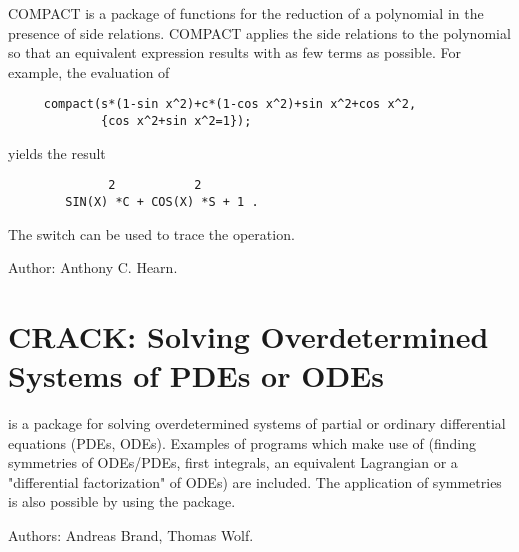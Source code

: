 COMPACT is a package of functions for the reduction of a polynomial in the
presence of side relations.  COMPACT applies the side relations to the
polynomial so that an equivalent expression results with as few terms as
possible.  For example, the evaluation of
\begin{verbatim}
     compact(s*(1-sin x^2)+c*(1-cos x^2)+sin x^2+cos x^2,
             {cos x^2+sin x^2=1});
\end{verbatim}
yields the result\pagebreak[1]
\begin{verbatim}
              2           2
        SIN(X) *C + COS(X) *S + 1 .
\end{verbatim}
The switch  can be used to trace the operation.

Author:  Anthony C. Hearn.
\fi

\section{CRACK: Solving Overdetermined Systems of PDEs or ODEs}

 is a package for solving overdetermined systems of partial or
ordinary differential equations (PDEs, ODEs).  Examples of programs which
make use of  (finding symmetries of ODEs/PDEs, first integrals, an
equivalent Lagrangian or a "differential factorization" of ODEs) are
included.  The application of symmetries is also possible by using the
 package.

Authors: Andreas Brand, Thomas Wolf.


\iffalse
\newpage

\section{CVIT: Fast Calculation of Dirac Gamma Matrix Traces}
\indexpackage{CVIT}
\label{CVIT}

This package provides an alternative method for computing traces of Dirac
gamma matrices, based on an algorithm by Cvitanovich that treats gamma
matrices as 3-j symbols.

Authors: V.Ilyin, A.Kryukov, A.Rodionov, A.Taranov.


\fi

\iffalse
\newpage

